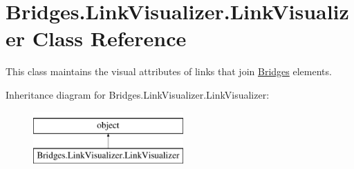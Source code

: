 \hypertarget{class_bridges_1_1_link_visualizer_1_1_link_visualizer}{}\section{Bridges.\+Link\+Visualizer.\+Link\+Visualizer Class Reference}
\label{class_bridges_1_1_link_visualizer_1_1_link_visualizer}


This class maintains the visual attributes of links that join \mbox{\hyperlink{namespace_bridges_1_1_bridges}{Bridges}} elements.  


Inheritance diagram for Bridges.\+Link\+Visualizer.\+Link\+Visualizer\+:\begin{figure}[H]
\begin{center}
\leavevmode
\includegraphics[height=2.000000cm]{class_bridges_1_1_link_visualizer_1_1_link_visualizer}
\end{center}
\end{figure}
